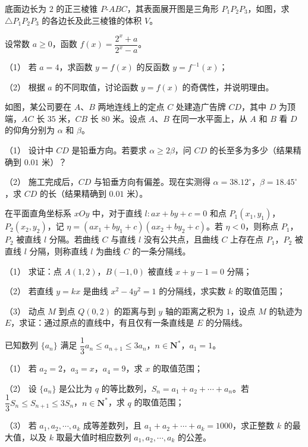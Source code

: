 \Needspace{0.4\textheight}
\begin{question}
底面边长为 $2$ 的正三棱锥 $P\text{-}ABC$，其表面展开图是三角形 $P_1P_2P_3$，如图，求 $\triangle P_1P_2P_3$ 的各边长及此三棱锥的体积 $V$。
\nopagebreak[4]
\begin{center}\end{center}
\nopagebreak[4]
\end{question}
\begin{question}
设常数 $a\geqslant0$，函数 $f(x)=\dfrac{2^x+a}{2^x-a}$。

（1） 若 $a=4$，求函数 $y=f(x)$ 的反函数 $y=f^{-1}(x)$；

（2） 根据 $a$ 的不同取值，讨论函数 $y=f(x)$ 的奇偶性，并说明理由。

\Needspace{0.4\textheight}
\end{question}
\begin{question}
如图，某公司要在 $A$、$B$ 两地连线上的定点 $C$ 处建造广告牌 $CD$，其中 $D$ 为顶端，$AC$ 长 $35$ 米，$CB$ 长 $80$ 米。设点 $A$、$B$ 在同一水平面上，从 $A$ 和 $B$ 看 $D$ 的仰角分别为 $\alpha$ 和 $\beta$。
\nopagebreak[4]
\begin{center}\end{center}
\nopagebreak[4]
（1） 设计中 $CD$ 是铅垂方向。若要求 $\alpha\geqslant2\beta$，问 $CD$ 的长至多为多少（结果精确到 $0.01$ 米）？

（2） 施工完成后，$CD$ 与铅垂方向有偏差。现在实测得 $\alpha=38.12^\circ$，$\beta=18.45^\circ$，求 $CD$ 的长（结果精确到 $0.01$ 米）。

\end{question}
\begin{question}
在平面直角坐标系 $xOy$ 中，对于直线 $l:ax+by+c=0$ 和点 $P_1(x_1,y_1)$，$P_2(x_2,y_2)$，记 $\eta=(ax_1+by_1+c)(ax_2+by_2+c)$。若 $\eta<0$，则称点 $P_1$，$P_2$ 被直线 $l$ 分隔。若曲线 $C$ 与直线 $l$ 没有公共点，且曲线 $C$ 上存在点 $P_1$，$P_2$ 被直线 $l$ 分隔，则称直线 $l$ 为曲线 $C$ 的一条分隔线。

（1） 求证：点 $A(1,2)$，$B(-1,0)$ 被直线 $x+y-1=0$ 分隔；

（2） 若直线 $y=kx$ 是曲线 $x^2-4y^2=1$ 的分隔线，求实数 $k$ 的取值范围；

（3） 动点 $M$ 到点 $Q(0,2)$ 的距离与到 $y$ 轴的距离之积为 $1$，设点 $M$ 的轨迹为 $E$，求证：通过原点的直线中，有且仅有一条直线是 $E$ 的分隔线。

\end{question}
\begin{question}
已知数列 $\{a_n\}$ 满足 $\dfrac13a_n\leqslant a_{n+1}\leqslant3a_n$，$n\in\mathbf N^*$，$a_1=1$。

（1） 若 $a_2=2$，$a_3=x$，$a_4=9$，求 $x$ 的取值范围；

（2） 设 $\{a_n\}$ 是公比为 $q$ 的等比数列，$S_n=a_1+a_2+\cdots+a_n$。若 $\dfrac13S_n\leqslant S_{n+1}\leqslant3S_n$，$n\in\mathbf N^*$，求 $q$ 的取值范围；

（3） 若 $a_1,a_2,\cdots,a_k$ 成等差数列，且 $a_1+a_2+\cdots+a_k=1000$，求正整数 $k$ 的最大值，以及 $k$ 取最大值时相应数列 $a_1,a_2,\cdots,a_k$ 的公差。

\end{question}
